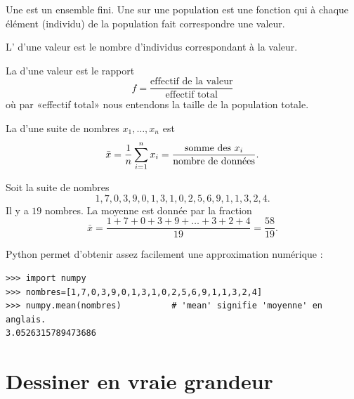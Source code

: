 \begin{definition}
    Une  est un ensemble fini. Une  sur une population est une fonction qui à chaque élément (individu) de la population fait correspondre une valeur.

    L' d'une valeur est le nombre d'individus correspondant à la valeur.

    La  d'une valeur est le rapport
    \begin{equation}
        f=\frac{ \text{effectif de la valeur} }{ \text{effectif total} }
    \end{equation}
    où par «effectif total» nous entendons la taille de la population totale.
\end{definition}

La  d'une suite de nombres \( x_1,\ldots, x_n\) est
\begin{equation}
    \bar x=\frac{1}{ n }\sum_{i=1}^nx_i=\frac{ \text{somme des \( x_i\)} }{\text{nombre de données}}.
\end{equation}

\begin{example}
    Soit la suite de nombres
    \begin{equation}
        1,7,0,3,9,0,1,3,1,0,2,5,6,9,1,1,3,2,4.
    \end{equation}
    Il y a \( 19\) nombres. La moyenne est donnée par la fraction
    \begin{equation}
        \bar x=\frac{ 1+7+0+3+9+\ldots+3+2+4 }{ 19 }=\frac{ 58 }{ 19 }.
    \end{equation}

Python permet d'obtenir assez facilement une approximation numérique :
    \begin{verbatim}
>>> import numpy
>>> nombres=[1,7,0,3,9,0,1,3,1,0,2,5,6,9,1,1,3,2,4]
>>> numpy.mean(nombres)          # 'mean' signifie 'moyenne' en anglais.
3.0526315789473686 
    \end{verbatim}
\end{example}


\section{Dessiner en vraie grandeur}

